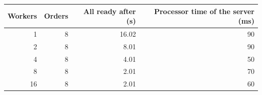 \begin{tabular}{rrrr}
\toprule
Workers & Orders & All ready after (s) & Processor time of the server (ms) \\
\midrule
1 & 8 & 16.02 & 90 \\
2 & 8 & 8.01 & 90 \\
4 & 8 & 4.01 & 50 \\
8 & 8 & 2.01 & 70 \\
16 & 8 & 2.01 & 60 \\
\bottomrule
\end{tabular}
